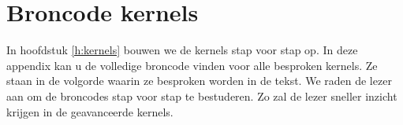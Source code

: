 \chapter{Broncode kernels}
\label{app:A}
In hoofdstuk \ref{h:kernels} bouwen we de kernels stap voor stap op. In deze appendix kan u de volledige broncode vinden voor alle besproken kernels. Ze staan in de volgorde waarin ze besproken worden in de tekst. We raden de lezer aan om de broncodes stap voor stap te bestuderen. Zo zal de lezer sneller inzicht krijgen in de geavanceerde kernels.

\newpage


\newpage


\newpage


\newpage


\newpage



